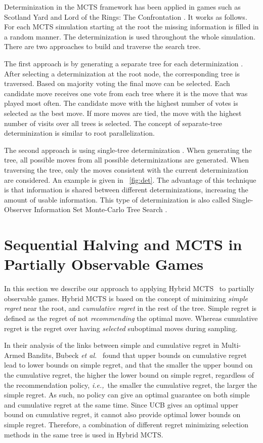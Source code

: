 \documentclass[a4paper]{llncs}
\newcommand{\ie}{{\it i.e.,}~}
\begin{document}
Determinization in the MCTS framework has been applied in games such as Scotland Yard \cite{nijssen12tciaig} and Lord of the Rings: The Confrontation \cite{cowling2012}. It works as follows. For each MCTS simulation starting at the root the missing information  is filled in a  random manner. The determinization is used throughout the whole simulation. There are two approaches to build and traverse the search tree. 

The first approach is by generating a separate tree for each determinization \cite{cowling2012}. After selecting a determinization at the root node, the corresponding tree is traversed. Based on majority voting \cite{nijssen12tciaig} the final move can be selected. Each candidate move receives one vote from each tree where it is the move that was played most often. The candidate move with the highest number of votes is selected
as the best move. If more moves are tied, the move with the highest number of visits
over all trees is selected. The concept of separate-tree determinization is similar to root parallelization.

The second approach is using single-tree determinization \cite{ciancarini10,cowling2012,nijssen12tciaig}. When generating the tree, all possible moves from all possible determinizations are generated. When traversing the tree, only the moves consistent with the current determinization are considered. An example is given in \figurename~\ref{fig:det}. The advantage of this technique is that information is shared between different determinizations, increasing the amount of usable information. This type of determinization is  also called Single-Observer Information Set Monte-Carlo Tree Search \cite{cowling2012}.

\section{Sequential Halving and MCTS in Partially Observable Games}
\label{sec:h-mcts}

In this section we describe our approach to applying Hybrid MCTS~\cite{Pepels14hmcts} to partially observable games. Hybrid MCTS is based on the concept of minimizing \emph{simple regret} near the root, and \emph{cumulative regret} in the rest of the tree. Simple regret is defined as the regret of not \emph{recommending} the optimal move. Whereas cumulative regret is the regret over having \emph{selected} suboptimal moves during sampling.

In their analysis of the links between simple and cumulative regret in Multi-Armed Bandits, Bubeck \emph{et al.}~\cite{Bubeck11Pure} found that upper bounds on cumulative regret lead to lower bounds on simple regret, and that the smaller the upper bound on the cumulative regret, the higher the lower bound on simple regret, regardless of the recommendation policy, \ie the smaller the cumulative regret, the larger the simple regret. As such, no policy can give an optimal guarantee on both simple and cumulative regret at the same time. Since UCB gives an optimal upper bound on cumulative regret, it cannot also provide optimal lower bounds on simple regret. Therefore, a combination of different regret minimizing selection methods in the same tree is used in Hybrid MCTS.
\end{document}
